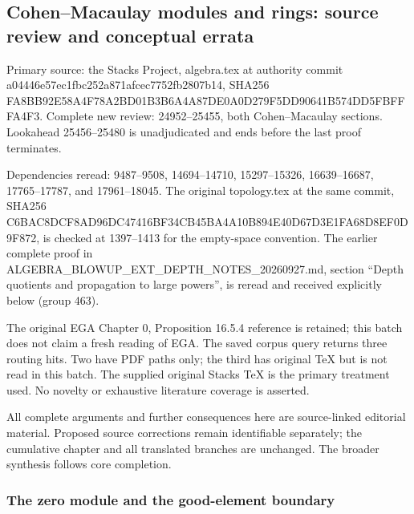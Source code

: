 \subsection{Cohen--Macaulay modules and rings: source review and conceptual errata}\label{algebra-proof-019-cohenmacaulay-modules-and-rings-source-review-and-conceptual-errata}

Primary source: the Stacks Project, algebra.tex at authority commit a044\allowbreak{}46e5\allowbreak{}7ec1\allowbreak{}fbc2\allowbreak{}52a8\allowbreak{}71af\allowbreak{}cec7\allowbreak{}752f\allowbreak{}b280\allowbreak{}7b14, SHA256 FA8B\allowbreak{}B92E\allowbreak{}58A4\allowbreak{}F78A\allowbreak{}2BD0\allowbreak{}1B3B\allowbreak{}6A4A\allowbreak{}87DE\allowbreak{}0A0D\allowbreak{}279F\allowbreak{}5DD9\allowbreak{}0641\allowbreak{}B574\allowbreak{}DD5F\allowbreak{}BFFF\allowbreak{}A4F3. Complete new review: 24952--25455, both Cohen--Macaulay sections. Lookahead 25456--25480 is unadjudicated and ends before the last proof terminates.

Dependencies reread: 9487--9508, 14694--14710, 15297--15326, 16639--16687, 17765--17787, and 17961--18045. The original topology.tex at the same commit, SHA256 C6BA\allowbreak{}C8DC\allowbreak{}F8AD\allowbreak{}96DC\allowbreak{}4741\allowbreak{}6BF3\allowbreak{}4CB4\allowbreak{}5BA4\allowbreak{}A10B\allowbreak{}894E\allowbreak{}40D6\allowbreak{}7D3E\allowbreak{}1FA6\allowbreak{}8D8E\allowbreak{}F0D9\allowbreak{}F872, is checked at 1397--1413 for the empty-space convention. The earlier complete proof in ALGEBRA\_\allowbreak{}BLOWUP\_\allowbreak{}EXT\_\allowbreak{}DEPTH\_\allowbreak{}NOTES\_\allowbreak{}20260927.\allowbreak{}md, section ``Depth quotients and propagation to large powers'', is reread and received explicitly below (group 463).

The original EGA Chapter 0, Proposition 16.5.4 reference is retained; this batch does not claim a fresh reading of EGA. The saved corpus query returns three routing hits. Two have PDF paths only; the third has original TeX but is not read in this batch. The supplied original Stacks TeX is the primary treatment used. No novelty or exhaustive literature coverage is asserted.

All complete arguments and further consequences here are source-linked editorial material. Proposed source corrections remain identifiable separately; the cumulative chapter and all translated branches are unchanged. The broader synthesis follows core completion.

\subsubsection{The zero module and the good-element boundary}\label{algebra-proof-019-the-zero-module-and-the-good-element-boundary}

